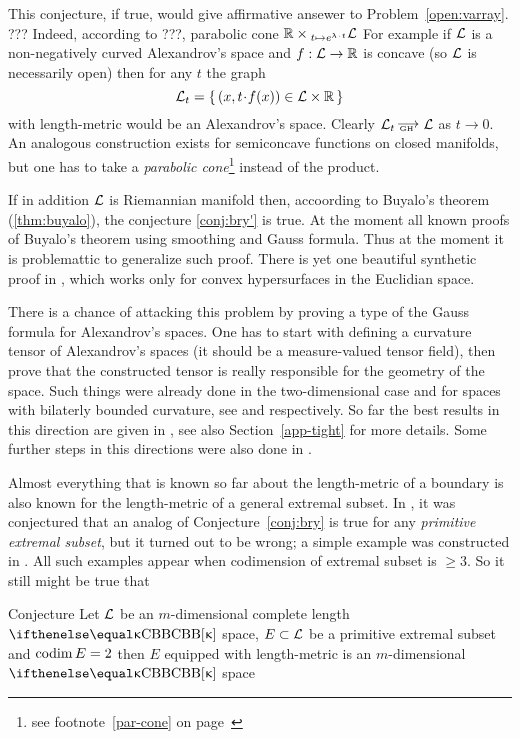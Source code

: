 This conjecture, if true, would give affirmative ansewer to Problem~\ref{open:varray}.
???
Indeed, according to ???,
parabolic cone $\RR\times_{t\mapsto e^{\lambda\cdot t}}\spc{L}$
For example if $\mathcal{L}$ is a non-negatively curved Alexandrov's space and $f:\spc{L}\to\RR$ is concave (so $\mathcal{L}$ is necessarily open) then for any $t$ the graph
\[\spc{L}_t=\{\,(x,t\cdot f(x))\in \spc{L}\times\RR\,\}\]
with length-metric would be an Alexandrov's space. 
Clearly $\spc{L}_t\GHto \spc{L}$ as $t\to0$. 
An analogous construction exists for semiconcave functions on closed manifolds, but
one has to take a \emph{parabolic cone}\footnote{see footnote~\ref{par-cone} on page~\pageref{par-cone}} instead of the product.




If in addition $\mathcal{L}$ is Riemannian manifold
then, accoording to Buyalo's theorem (\ref{thm:buyalo}),
the conjecture \ref{conj:bry'} is true.
At the moment all known proofs of Buyalo's theorem using smoothing and Gauss formula.
Thus at the moment it is problemattic to generalize such proof.
There is yet one beautiful synthetic proof in \cite{milka-conv}, which works only for convex hypersurfaces in the Euclidian space.

There is a chance of attacking this problem by proving a type of the Gauss formula for
Alexandrov's spaces. 
One has to start with defining a curvature tensor of Alexandrov's spaces (it
should be a measure-valued tensor field), then prove that the constructed tensor is really responsible for the geometry of the space. 
Such things were already done in the two-dimensional case and for spaces with bilaterly bounded curvature, see \cite{reshetnyak:curvature} and
\cite{nikolaev:curvature} respectively.
So far the best results in this direction are given in \cite{perelman:DC}, 
see also Section~\ref{app-tight} for more details.
Some further steps in this directions were also done in \cite{lebedeva-curv}. 

Almost everything that is known so far about the length-metric of a boundary is also known for the length-metric of a general extremal subset.
In \cite{perelman-petrunin:extremal}, it was conjectured  that an analog of Conjecture~\ref{conj:bry} is true for any \emph{primitive extremal subset}, but it turned out to be wrong; a simple example was constructed in \cite{petrunin:extremal}. 
All such examples appear when codimension of extremal subset is $\ge 3$.
So it still might be true that

\begin{thm}{Conjecture}\label{conj:codim=2}
Let $\mathcal{L}$ be an $m$-dimensional complete length $\Alex\kappa$ space, $E\subset \spc{L}$ be a primitive extremal subset and $\mathop{\rm codim}\nolimits
E=2$ then $E$ equipped with length-metric is an $m$-dimensional $\Alex\kappa$ space
\end{thm}


